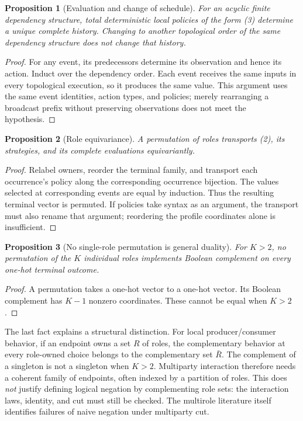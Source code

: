 \documentclass[11pt]{article}
\newtheorem{proposition}{Proposition}
\begin{document}
\begin{proposition}[Evaluation and change of schedule]
For an acyclic finite dependency structure, total deterministic local policies
of the form (3) determine a unique complete history. Changing to another
topological order of the same dependency structure does not change that history.
\end{proposition}
\begin{proof}
For any event, its predecessors determine its observation and hence its action.
Induct over the dependency order. Each event receives the same inputs in every
topological execution, so it produces the same value. This argument uses the same
event identities, action types, and policies; merely rearranging a broadcast
prefix without preserving observations does not meet the hypothesis.
\end{proof}

\begin{proposition}[Role equivariance]
A permutation of roles transports (2), its strategies, and its complete
evaluations equivariantly.
\end{proposition}
\begin{proof}
Relabel owners, reorder the terminal family, and transport each occurrence's
policy along the corresponding occurrence bijection. The values selected at
corresponding events are equal by induction. Thus the resulting terminal vector
is permuted. If policies take syntax as an argument, the transport must also
rename that argument; reordering the profile coordinates alone is insufficient.
\end{proof}

\begin{proposition}[No single-role permutation is general duality]
For $K>2$, no permutation of the $K$ individual roles implements Boolean
complement on every one-hot terminal outcome.
\end{proposition}
\begin{proof}
A permutation takes a one-hot vector to a one-hot vector. Its Boolean complement
has $K-1$ nonzero coordinates. These cannot be equal when $K>2$.
\end{proof}

The last fact explains a structural distinction. For local producer/consumer
behavior, if an endpoint owns a set $R$ of roles, the complementary behavior at
every role-owned choice belongs to the complementary set $\bar R$. The complement
of a singleton is not a singleton when $K>2$. Multiparty interaction therefore
needs a coherent family of endpoints, often indexed by a partition of roles.
This does \emph{not} justify defining logical negation by complementing role sets:
the interaction laws, identity, and cut must still be checked. The multirole
literature itself identifies failures of naive negation under multiparty cut.
\end{document}

